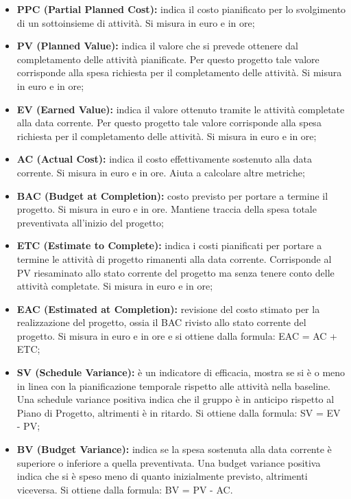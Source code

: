 		\begin{itemize}
			\item \textbf{PPC (Partial Planned Cost): }indica il costo pianificato per lo svolgimento di un sottoinsieme di attività. Si misura in euro e in ore;
			\item \textbf{PV (Planned Value): }indica il valore che si prevede ottenere dal completamento delle attività pianificate. Per questo progetto tale valore corrisponde alla spesa richiesta per il completamento delle attività. Si misura in euro e in ore;
			\item \textbf{EV (Earned Value): }indica il valore ottenuto tramite le attività completate alla data corrente. Per questo progetto tale valore corrisponde alla spesa richiesta per il completamento delle attività. Si misura in euro e in ore;
			\item \textbf{AC (Actual Cost): }indica il costo effettivamente sostenuto alla data corrente. Si misura in euro e in ore. Aiuta a calcolare altre metriche;
			\item \textbf{BAC (Budget at Completion): }costo previsto per portare a termine il progetto. Si misura in euro e in ore. Mantiene traccia della spesa totale preventivata all'inizio del progetto;
			\item \textbf{ETC (Estimate to Complete): }indica i costi pianificati per portare a termine le attività di progetto rimanenti alla data corrente. Corrisponde al PV riesaminato allo stato corrente del progetto ma senza tenere conto delle attività completate. Si misura in euro e in ore;
			\item \textbf{EAC (Estimated at Completion): }revisione del costo stimato per la realizzazione del progetto, ossia il BAC rivisto allo stato corrente del progetto. Si misura in euro e in ore e si ottiene dalla formula: EAC = AC + ETC;
			\item \textbf{SV (Schedule Variance): }è un indicatore di efficacia, mostra se si è o meno in linea con la pianificazione temporale rispetto alle attività nella baseline. Una schedule variance positiva indica che il gruppo è in anticipo rispetto al Piano di Progetto, altrimenti è in ritardo. Si ottiene dalla formula: SV = EV - PV;
			\item \textbf{BV (Budget Variance): }indica se la spesa sostenuta alla data corrente è superiore o inferiore a quella preventivata. Una budget variance positiva indica che si è speso meno di quanto inizialmente previsto,  altrimenti viceversa. Si ottiene dalla formula: BV = PV - AC.
			
		\end{itemize}
		
